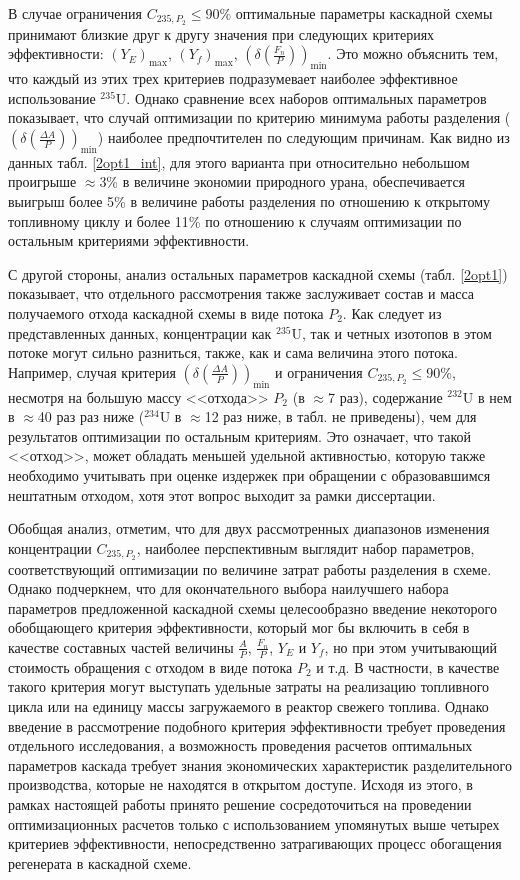 В случае ограничения $C_{235,{P_2}} \leq 90\%$ оптимальные параметры каскадной схемы принимают близкие друг к другу значения при следующих критериях эффективности: $(Y_{E})_\text{max}$, $(Y_f)_\text{max}$, $(\delta(\frac{F_n}{P}))_\text{min}$. Это можно объяснить тем, что каждый из этих трех критериев подразумевает наиболее эффективное использование $^{235}$U. Однако сравнение всех наборов оптимальных параметров показывает, что случай оптимизации по критерию минимума работы разделения ($(\delta(\frac{\Delta A}{P}))_\text{min}$) наиболее предпочтителен по следующим причинам. Как видно из данных табл. \ref{2opt1_int}, для этого варианта при относительно небольшом проигрыше $\approx$3\% в величине экономии природного урана, обеспечивается выигрыш более 5\% в величине работы разделения по отношению к открытому топливному циклу и более 11\% по отношению к случаям оптимизации по остальным критериями эффективности.

С другой стороны, анализ остальных параметров каскадной схемы (табл. \ref{2opt1}) показывает, что отдельного рассмотрения также заслуживает состав и масса получаемого отхода каскадной схемы в виде потока $P_2$. Как следует из представленных данных, концентрации как $^{235}$U, так и четных изотопов в этом потоке могут сильно разниться, также, как и сама величина этого потока. Например, случая критерия $(\delta(\frac{\Delta A}{P}))_\text{min}$ и ограничения $C_{235,{P_2}} \leq 90\%$, несмотря на большую массу <<отхода>> $P_{2}$ (в $\approx$7 раз), содержание $^{232}$U в нем в $\approx$40 раз раз ниже ($^{234}$U в $\approx$12 раз ниже, в табл. не приведены), чем для результатов оптимизации по остальным критериям. Это означает, что такой <<отход>>, может обладать меньшей удельной активностью, которую также необходимо учитывать при оценке издержек при обращении с образовавшимся нештатным отходом, хотя этот вопрос выходит за рамки диссертации. 

Обобщая анализ, отметим, что для двух рассмотренных диапазонов изменения концентрации $C_{235,{P_2}}$, наиболее перспективным выглядит набор параметров, соответствующий оптимизации по величине затрат работы разделения в схеме. Однако подчеркнем, что для окончательного выбора наилучшего набора параметров предложенной каскадной схемы целесообразно введение некоторого обобщающего критерия эффективности, который мог бы включить в себя в качестве составных частей величины $\frac{A}{P}$, $\frac{F_n}{P}$, $Y_E$ и $Y_f$, но при этом учитывающий стоимость обращения с отходом в виде потока $P_2$ и т.д. В частности, в качестве такого критерия могут выступать удельные затраты на реализацию топливного цикла или на единицу массы загружаемого в реактор свежего топлива. Однако введение в рассмотрение подобного критерия эффективности требует проведения отдельного исследования, а возможность проведения расчетов оптимальных параметров каскада требует знания экономических характеристик разделительного производства, которые не находятся в открытом доступе. Исходя из этого, в рамках настоящей работы принято решение сосредоточиться на проведении оптимизационных расчетов только с использованием упомянутых выше четырех критериев эффективности, непосредственно затрагивающих процесс обогащения регенерата в каскадной схеме.

